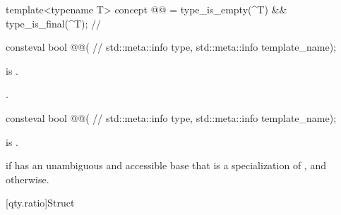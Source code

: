 \begin{itemdecl}
template<typename T>
concept @@ = type_is_empty(^T) && type_is_final(^T);  // \expos
\end{itemdecl}

\begin{itemdecl}
consteval bool @@(  // \expos
  std::meta::info type, std::meta::info template_name);
\end{itemdecl}

\begin{itemdescr}
\pnum
\expects
{} is .

\pnum
\returns
{}.
\end{itemdescr}

\begin{itemdecl}
consteval bool @@(  // \expos
  std::meta::info type, std::meta::info template_name);
\end{itemdecl}

\begin{itemdescr}
\pnum
\expects
{} is .

\pnum
\returns
{} if
\tcode{[:type:]} has an unambiguous and accessible base
that is a specialization of , and
 otherwise.
\end{itemdescr}

[qty.ratio]{Struct }

